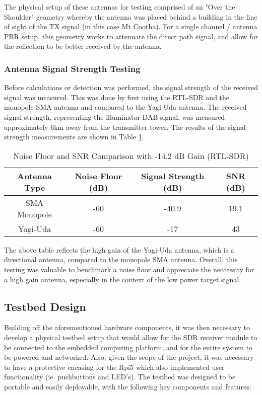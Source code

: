 

The physical setup of these antennas for testing comprised of an "Over the Shoulder" geometry whereby the antenna was placed behind a building in the line of sight of the TX signal (in this case Mt Cootha). For a single channel / antenna PBR setup, this geometry works to attenuate the direct path signal, and allow for the reflection to be better received by the antenna. 

\subsubsection{Antenna Signal Strength Testing}
Before calculations or detection was performed, the signal strength of the received signal was measured. This was done by first using the RTL-SDR and the monopole SMA antenna and compared to the Yagi-Uda antenna. The received signal strength, representing the illuminator DAB signal, was measured approximately 6km away from the transmitter tower.  The results of the signal strength measurements are shown in Table \ref{tab:signalstrength}.

\begin{table}[h!]
    \centering
    \caption{Noise Floor and SNR Comparison with -14.2 dB Gain (RTL-SDR)}
    \label{tab:signalstrength}
    \begin{tabular}{|c|c|c|c|}
        \hline
        \textbf{Antenna Type} & \textbf{Noise Floor (dB)} & \textbf{Signal Strength (dB)} & \textbf{SNR (dB)} \\ \hline
        SMA Monopole & -60 & -40.9 & 19.1 \\ \hline
        Yagi-Uda     & -60 & -17   & 43   \\ \hline
    \end{tabular}
    \vspace{0.5cm}
\end{table}

The above table reflects the high gain of the Yagi-Uda antenna, which is a directional antenna, compared to the monopole SMA antenna. Overall, this testing was valuable to benchmark a noise floor and appreciate the neccessity for a high gain antenna, especially in the context of the low power target signal.


\subsection{Testbed Design \label{sec:testbed}}
Building off the aforementioned hardware components, it was then necessary to develop a physical testbed setup that would allow for the SDR receiver module to be connected to the embedded computing platform, and for the entire system to be powered and networked. Also, given the scope of the project, it was necessary to have a protective encasing for the Rpi5 which also implemented user functionality (ie. pushbuttons and LED's). The testbed was designed to be portable and easily deployable, with the following key components and features:

